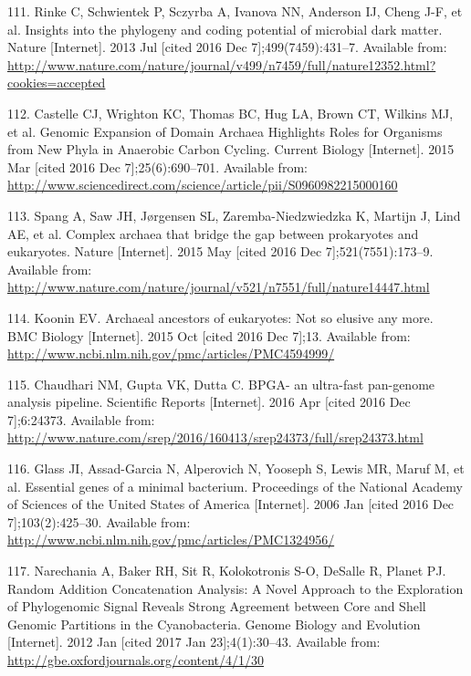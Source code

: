 \documentclass[12pt,twoside]{reedthesis}
\begin{document}
  \hypertarget{ref-rinke_insights_2013}{}
  111. Rinke C, Schwientek P, Sczyrba A, Ivanova NN, Anderson IJ, Cheng
  J-F, et al. Insights into the phylogeny and coding potential of
  microbial dark matter. Nature {[}Internet{]}. 2013 Jul {[}cited 2016 Dec
  7{]};499(7459):431--7. Available from:
  \url{http://www.nature.com/nature/journal/v499/n7459/full/nature12352.html?cookies=accepted}
  
  \hypertarget{ref-castelle_genomic_2015}{}
  112. Castelle CJ, Wrighton KC, Thomas BC, Hug LA, Brown CT, Wilkins MJ,
  et al. Genomic Expansion of Domain Archaea Highlights Roles for
  Organisms from New Phyla in Anaerobic Carbon Cycling. Current Biology
  {[}Internet{]}. 2015 Mar {[}cited 2016 Dec 7{]};25(6):690--701.
  Available from:
  \url{http://www.sciencedirect.com/science/article/pii/S0960982215000160}
  
  \hypertarget{ref-spang_complex_2015}{}
  113. Spang A, Saw JH, Jørgensen SL, Zaremba-Niedzwiedzka K, Martijn J,
  Lind AE, et al. Complex archaea that bridge the gap between prokaryotes
  and eukaryotes. Nature {[}Internet{]}. 2015 May {[}cited 2016 Dec
  7{]};521(7551):173--9. Available from:
  \url{http://www.nature.com/nature/journal/v521/n7551/full/nature14447.html}
  
  \hypertarget{ref-koonin_archaeal_2015}{}
  114. Koonin EV. Archaeal ancestors of eukaryotes: Not so elusive any
  more. BMC Biology {[}Internet{]}. 2015 Oct {[}cited 2016 Dec 7{]};13.
  Available from:
  \url{http://www.ncbi.nlm.nih.gov/pmc/articles/PMC4594999/}
  
  \hypertarget{ref-chaudhari_bpga-_2016}{}
  115. Chaudhari NM, Gupta VK, Dutta C. BPGA- an ultra-fast pan-genome
  analysis pipeline. Scientific Reports {[}Internet{]}. 2016 Apr {[}cited
  2016 Dec 7{]};6:24373. Available from:
  \url{http://www.nature.com/srep/2016/160413/srep24373/full/srep24373.html}
  
  \hypertarget{ref-glass_essential_2006}{}
  116. Glass JI, Assad-Garcia N, Alperovich N, Yooseph S, Lewis MR, Maruf
  M, et al. Essential genes of a minimal bacterium. Proceedings of the
  National Academy of Sciences of the United States of America
  {[}Internet{]}. 2006 Jan {[}cited 2016 Dec 7{]};103(2):425--30.
  Available from:
  \url{http://www.ncbi.nlm.nih.gov/pmc/articles/PMC1324956/}
  
  \hypertarget{ref-narechania_random_2012}{}
  117. Narechania A, Baker RH, Sit R, Kolokotronis S-O, DeSalle R, Planet
  PJ. Random Addition Concatenation Analysis: A Novel Approach to the
  Exploration of Phylogenomic Signal Reveals Strong Agreement between Core
  and Shell Genomic Partitions in the Cyanobacteria. Genome Biology and
  Evolution {[}Internet{]}. 2012 Jan {[}cited 2017 Jan 23{]};4(1):30--43.
  Available from: \url{http://gbe.oxfordjournals.org/content/4/1/30}
  
\end{document}
